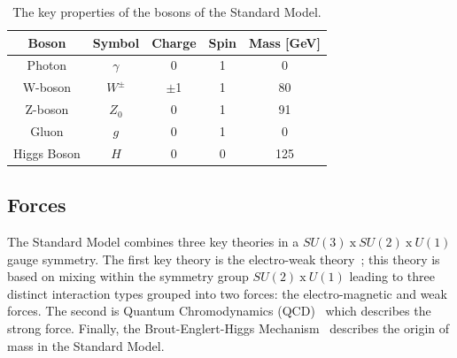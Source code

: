 \begin{itemize}[leftmargin=*]
  {\renewcommand{\arraystretch}{1.5}
  \begin{table}[!ht]
  \begin{center}
    \begin{tabular}{|c||c|c|c|c|}
      \hline
    Boson            & Symbol        & Charge  &  Spin  &  Mass [GeV]\\
    \hline
    Photon           &   $\gamma$    &  0      &  1     &  0 \\
    W-boson          &   $W^{\pm}$    & $\pm$1  &  1     &  80 \\
    Z-boson          &   $Z_0$       &  0      &  1     &  91\\
    Gluon            &   $g$         &  0      &  1     &  0 \\
    Higgs Boson      &   $H$         &  0      &  0     &  125\\
    \hline  
  \end{tabular}
    \caption{The key properties of the bosons of the  Standard Model. }
  \label{tab:theo-sm_bosons}
  \end{center}
  \end{table}}
    
\end{itemize}

\subsection{Forces}
\label{theo-sm_forces}

The Standard Model combines three key theories in a
$SU(3)~\text{x}~SU(2)~\text{x}~U(1)$ gauge symmetry.
The first key theory is the electro-weak theory~\cite{theo-glashow};
this theory is based on mixing within the symmetry group $SU(2)~\text{x}~U(1)$
leading to three distinct interaction types grouped into two forces:
the electro-magnetic and weak forces.
The second is Quantum Chromodynamics (QCD)~\cite{theo-qcd} which describes the strong force.
Finally, the Brout-Englert-Higgs Mechanism~\cite{theo-be,theo-higgs} describes the origin of mass in the Standard Model.

